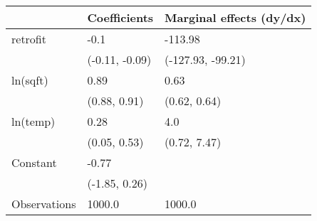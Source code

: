 \begin{tabular}{lll}
\toprule
{} &    Coefficients & Marginal effects (dy/dx) \\
\midrule
retrofit     &            -0.1 &                  -113.98 \\
             &  (-0.11, -0.09) &        (-127.93, -99.21) \\
ln(sqft)     &            0.89 &                     0.63 \\
             &    (0.88, 0.91) &             (0.62, 0.64) \\
ln(temp)     &            0.28 &                      4.0 \\
             &    (0.05, 0.53) &             (0.72, 7.47) \\
Constant     &           -0.77 &                          \\
             &   (-1.85, 0.26) &                          \\
Observations &          1000.0 &                   1000.0 \\
\bottomrule
\end{tabular}
